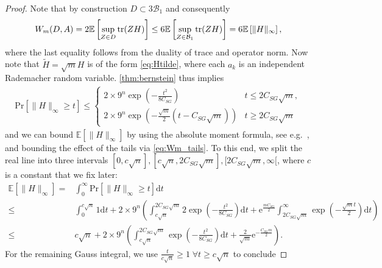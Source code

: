 \begin{proof}
Note that by construction $D \subset 3 \mathcal{B}_1$ and consequently
\begin{align}
  W_m (D, A) = 2 \mathbb{E} \left[ \sup_{Z \in D} \operatorname{tr} (Z H) \right] \leq 6 \mathbb{E} \left[ \sup_{Z \in \mathcal{B}_1} \operatorname{tr} (Z H) \right] = 6 \mathbb{E} \left[ \| H \|_\infty  \right], \label{eq:Wm_hoelder}
\end{align}
where the last equality follows from the duality of trace and operator norm. Now note that $\tilde{H} = \sqrt{m} H$ is of the form \eqref{eq:Htilde}, where each $a_k$ is an independent Rademacher random variable.
\cref{thm:bernstein} thus implies
\begin{align}
  \mathrm{Pr} \left[\| H \|_\infty \geq t \right]
  \leq
  \begin{cases}
   2 \times 9^n \exp \left( - \frac{t^2}{8 C_{SG}} \right) & t \leq 2C_{SG} \sqrt{m}, \\
  2 \times 9^n \exp \left( - \frac{\sqrt{m}}{2} \left( t - C_{SG} \sqrt{m} \right) \right) & t \geq 2 C_{SG} \sqrt{m}
  \end{cases}
  \label{eq:Wm_tails}
\end{align}
and we can bound $\mathbb{E} \left[ \| H \|_\infty \right]$ by using the absolute moment formula,
see e.g.\ \cite[Propostion~7.1]{Foucart_2013_Mathematical}, and bounding the effect of the tails via \eqref{eq:Wm_tails}.
To this end, we split the real line into three intervals $[0, c \sqrt{n}], [c\sqrt{n}, 2 C_{SG} \sqrt{m}], [2 C_{SG} \sqrt{m},\infty[$, where $c$ is a constant that we fix later:
\begin{align*}
  \mathbb{E} \left[ \|H\|_\infty \right] =& \int_0^\infty \mathrm{Pr} \left[ \|H\|_\infty \geq t \right] \mathrm{d}t \\
  \leq & \int_0^{c \sqrt{n}} 1 \mathrm{d}t + 2 \times 9^n \left( \int_{c \sqrt{n}}^{2 C_{SG} \sqrt{m}} 2 \exp \left( - \frac{t^2}{8 C_{SG}} \right) \mathrm{d}t
  +  \mathrm{e}^{\frac{m C_{SG}}{2}} \int_{2 C_{SG} \sqrt{m}}^\infty \exp\left( - \frac{\sqrt{m}t}{2}  \right) \mathrm{d} t \right)\\
  \leq & c \sqrt{n} + 2 \times 9^n \left( \int_{c \sqrt{n}}^{2 C_{SG} \sqrt{m}}  \exp \left( - \frac{t^2}{8 C_{SG}} \right) \mathrm{d}t
  + \frac{2}{\sqrt{m}} \mathrm{e}^{-\frac{C_{SG} m}{2}}\right).
\end{align*}
For the remaining Gauss integral, we use $\frac{t}{c \sqrt{n}} \geq 1\; \forall t \geq c\sqrt{n}$ to conclude

\end{proof}
